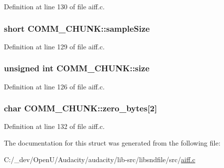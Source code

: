 Definition at line 130 of file aiff.\+c.

\subsubsection[{\texorpdfstring{sample\+Size}{sampleSize}}]{\setlength{\rightskip}{0pt plus 5cm}short C\+O\+M\+M\+\_\+\+C\+H\+U\+N\+K\+::sample\+Size}\hypertarget{struct_c_o_m_m___c_h_u_n_k_ab4f385615253bec48f581c4d3963bb90}{}\label{struct_c_o_m_m___c_h_u_n_k_ab4f385615253bec48f581c4d3963bb90}


Definition at line 129 of file aiff.\+c.

\subsubsection[{\texorpdfstring{size}{size}}]{\setlength{\rightskip}{0pt plus 5cm}unsigned {\bf int} C\+O\+M\+M\+\_\+\+C\+H\+U\+N\+K\+::size}\hypertarget{struct_c_o_m_m___c_h_u_n_k_abcec2de45f3418792a12c1acbb0cb8df}{}\label{struct_c_o_m_m___c_h_u_n_k_abcec2de45f3418792a12c1acbb0cb8df}


Definition at line 126 of file aiff.\+c.

\subsubsection[{\texorpdfstring{zero\+\_\+bytes}{zero_bytes}}]{\setlength{\rightskip}{0pt plus 5cm}char C\+O\+M\+M\+\_\+\+C\+H\+U\+N\+K\+::zero\+\_\+bytes\mbox{[}2\mbox{]}}\hypertarget{struct_c_o_m_m___c_h_u_n_k_a19b7fca0acce2bdd8edc5ee0814228ad}{}\label{struct_c_o_m_m___c_h_u_n_k_a19b7fca0acce2bdd8edc5ee0814228ad}


Definition at line 132 of file aiff.\+c.



The documentation for this struct was generated from the following file\+:\begin{DoxyCompactItemize}
\item 
C\+:/\+\_\+dev/\+Open\+U/\+Audacity/audacity/lib-\/src/libsndfile/src/\hyperlink{aiff_8c}{aiff.\+c}\end{DoxyCompactItemize}

